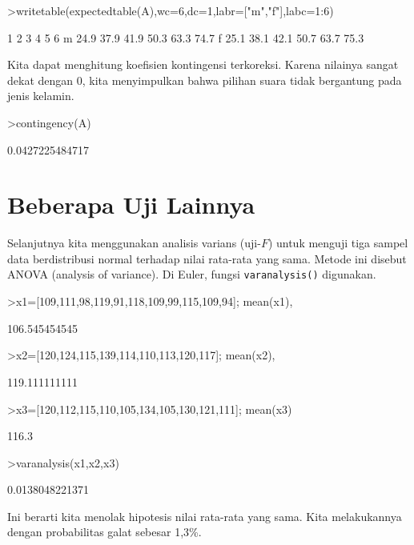 \documentclass[a4paper,11pt,oneside,enabledeprecatedfontcommands]{scrbook}
\newenvironment{eulernotebook}{}{}
\newcommand{\eulerheading}[1]{\chapter{#1}}
\newenvironment{eulercomment}{\par\medskip\noindent}{\par\medskip}
\begin{document}
\begin{eulernotebook}
		\begin{eulerprompt}
			>writetable(expectedtable(A),wc=6,dc=1,labr=["m","f"],labc=1:6)
		\end{eulerprompt}
		\begin{euleroutput}
			           1     2     3     4     5     6
			     m  24.9  37.9  41.9  50.3  63.3  74.7
			     f  25.1  38.1  42.1  50.7  63.7  75.3
		\end{euleroutput}
		\begin{eulercomment}
			Kita dapat menghitung koefisien kontingensi terkoreksi. Karena nilainya sangat dekat dengan 0, kita
			menyimpulkan bahwa pilihan suara tidak bergantung pada jenis kelamin.
		\end{eulercomment}
		\begin{eulerprompt}
			>contingency(A)
		\end{eulerprompt}
		\begin{euleroutput}
			0.0427225484717
		\end{euleroutput}
		
		\eulerheading{Beberapa Uji Lainnya}
		\begin{eulercomment}
			Selanjutnya kita menggunakan analisis varians (uji-$F$) untuk menguji tiga sampel data berdistribusi
			normal terhadap nilai rata-rata yang sama. Metode ini disebut ANOVA (analysis of variance). Di Euler,
			fungsi \texttt{varanalysis()} digunakan.
		\end{eulercomment}
		\begin{eulerprompt}
			>x1=[109,111,98,119,91,118,109,99,115,109,94]; mean(x1),
		\end{eulerprompt}
		\begin{euleroutput}
			106.545454545
		\end{euleroutput}
		\begin{eulerprompt}
			>x2=[120,124,115,139,114,110,113,120,117]; mean(x2),
		\end{eulerprompt}
		\begin{euleroutput}
			119.111111111
		\end{euleroutput}
		\begin{eulerprompt}
			>x3=[120,112,115,110,105,134,105,130,121,111]; mean(x3)
		\end{eulerprompt}
		\begin{euleroutput}
			116.3
		\end{euleroutput}
		\begin{eulerprompt}
			>varanalysis(x1,x2,x3)
		\end{eulerprompt}
		\begin{euleroutput}
			0.0138048221371
		\end{euleroutput}
		\begin{eulercomment}
			Ini berarti kita menolak hipotesis nilai rata-rata yang sama. Kita melakukannya dengan probabilitas
			galat sebesar 1,3\%.
			

\end{eulercomment}
\end{eulernotebook}
\end{document}
